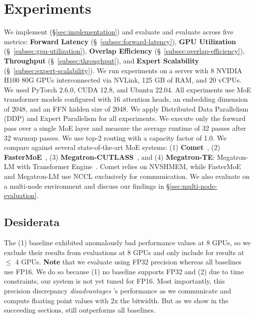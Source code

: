 \section{Experiments}
\label{sec:evaluation}
We implement (\S\ref{sec:implementation}) and evaluate \sysname and evaluate across
five metrics: \textbf{Forward Latency} (\S~\ref{subsec:forward-latency}),
\textbf{GPU Utilization} (\S~\ref{subsec:gpu-utilization}),
\textbf{Overlap Efficiency} (\S~\ref{subsec:overlap-efficiency}),
\textbf{Throughput} (\S~\ref{subsec:throughput}), and \textbf{Expert Scalability} (\S~\ref{subsec:expert-scalability}).
We run experiments on a server with 8 NVIDIA H100 80G GPUs interconnected via NVLink,
125 GB of RAM, and 20 vCPUs. We used PyTorch 2.6.0, CUDA 12.8, and Ubuntu 22.04.
All experiments use MoE transformer models configured with 16 attention heads,
an embedding dimension of 2048, and an FFN hidden size of 2048.
We apply Distributed Data Parallelism (DDP) and Expert Parallelism for all experiments.
We execute only the forward pass over a single MoE layer and measure the average runtime
of 32 passes after 32 warmup passes.
We use top-2 routing with a capacity factor of 1.0.
We compare \sysname against several state-of-the-art MoE systems:
(1) \textbf{Comet}~\cite{comet}, 
(2) \textbf{FasterMoE}~\cite{fastermoe}, 
(3) \textbf{Megatron-CUTLASS}~\cite{megatron-lm}, and
(4) \textbf{Megatron-TE}: Megatron-LM with Transformer Engine~\cite{transformer-engine}.
Comet relies on NVSHMEM, while FasterMoE and Megatron-LM use NCCL exclusively for communication.
We also evaluate \sysname on a multi-node environment and discuss our findings in \S\ref{sec:multi-node-evaluation}.
\subsection{Desiderata}\label{subsec:desiderata}
The (1) baseline exhibited anomalously bad performance values at 8 GPUs,
so we exclude their results from evaluations at 8 GPUs and only include for results at $\leq$
4 GPUs.
\textbf{Note} that we evaluate \sysname using FP32 precision whereas all baselines use FP16.
We do so because (1) no baseline supports FP32 and (2) due to time constraints,
our system is not yet tuned for FP16.
Most importantly, this precision discrepancy \emph{disadvantages} \sysname's performance
as we communicate and compute floating point values with 2x the bitwidth.
But as we show in the succeeding sections, \sysname still outperforms all baselines.
